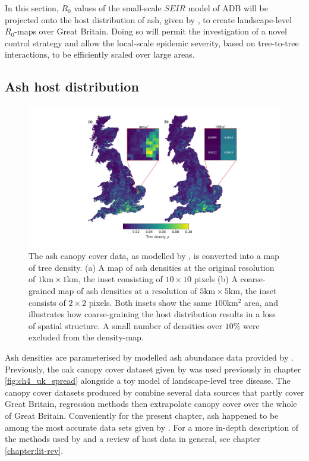 \label{sec:r0-map-construct}
In this section, $R_0$ values of the small-scale $SEIR$ model of ADB will be projected onto the host distribution of ash, given by \cite{hill.data}, to create landscape-level $R_0$-maps over Great Britain. 
Doing so will permit the investigation of a novel control strategy and allow the local-scale epidemic severity, based on tree-to-tree interactions, to be efficiently scaled over large areas.

\subsection{Ash host distribution}

\begin{figure}
    \centering
    \includegraphics[scale=0.45]{chapter6/figures/fig-ash-data.pdf}
    \caption{The ash canopy cover data, as modelled by \cite{hill.data}, is converted into a map of tree density. (a) A map of ash densities at the original resolution of $1\mathrm{km} \times 1\mathrm{km}$, the inset consisting of $10\times 10$ pixels (b) A coarse-grained map of ash densities at a resolution of $5\mathrm{km} \times 5\mathrm{km}$, the inset consists of $2 \times 2$ pixels. Both insets show the same $100\mathrm{km^2}$ area, and illustrates how coarse-graining the host distribution results in a loss of spatial structure. A small number of densities over $10\%$ were excluded from the density-map.}
    \label{fig:ash-host-data}
\end{figure}

Ash densities are parameterised by modelled ash abundance data provided by \cite{hill.data}. 
Previously, the oak canopy cover dataset given by \cite{hill.data} was used previously in chapter \ref{fig:ch4_uk_spread} alongside a toy model of landscape-level tree disease.
The canopy cover datasets produced by \cite{hill.data} combine several data sources that partly cover Great Britain, 
regression methods then extrapolate canopy cover over the whole of Great Britain.
Conveniently for the present chapter, ash happened to be among the most accurate data sets given by \cite{hill.data}. 
For a more in-depth description of the methods used by \cite{hill.data} and a review of host data in general, see chapter \ref{chapter:lit-rev}.

